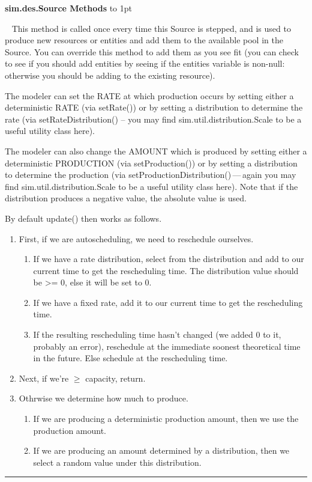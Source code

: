\documentclass[twoside,10pt]{article}
\newcommand\class[1]{\index{Classes!{#1}}\textsf{#1}}
\newcommand*{\xfill}[1][0pt]{%
	\cleaders
		\hbox to 1pt{\hss
			\raisebox{#1}{\rule{1.2pt}{0.4pt}}%
			\hss}\hfill}
\newenvironment{methods}[1]{
\vspace{1.0em}\noindent\textsf{\textbf{#1 Methods}}\quad \xfill[0.5ex]
\vspace{-0.25em}
\begin{description}
\small}
{\end{description}\hrule\vspace{1.5em}}
\newcommand{\mthd}[1]{\item[{\sf #1}]~\newline}
\begin{document}
\begin{methods}{\class{sim.des.Source}}
\mthd{protected void update()}
This method is called once every time this Source is stepped, and is used to produce new
        resources or entities and add them to the available pool in the Source.  You can override
        this method to add them as you see fit (you can check to see if you should add entities
        by seeing if the entities variable is non-null: otherwise you should be adding to the 
        existing resource).  
                
        The modeler can set the RATE at which production occurs by setting either a deterministic
        RATE (via setRate()) or by setting a distribution to determine the rate (via setRateDistribution() --
        you may find sim.util.distribution.Scale to be a useful utility class here).
        
        The modeler can also change the AMOUNT which is produced by setting either a deterministic
        PRODUCTION (via setProduction()) or by setting a distribution to determine the production (via
        setProductionDistribution()\,---\,again you may find sim.util.distribution.Scale to be a useful 
        utility class here).  Note that if the distribution produces a negative value, the absolute value is used.
        
        By default update() then works as follows.
        
        \begin{enumerate}
       \item First, if we are autoscheduling, we need to reschedule ourselves.
       \begin{enumerate}
        \item If we have a rate distribution, select from the distribution and add to our current time
        	 to get the rescheduling time.
            The distribution value should be >= 0, else it will be set to 0.
        \item If we have a fixed rate, add it to our current time to get the rescheduling time.
        \item If the resulting rescheduling time hasn't changed (we added 0 to it, probably an error), 
        reschedule at the immediate soonest theoretical time in the future.  Else schedule at the rescheduling time.
	\end{enumerate}
		
       \item Next, if we're \(\geq\) capacity, return.
        
        \item Othrwise we determine how much to produce.
        \begin{enumerate}
       \item If we are producing a deterministic production amount, then we use the production amount.
        \item If we are producing an amount determined by a distribution, then we select a random value 
        under this distribution.
        \end{enumerate}
        \end{enumerate}
                    

\end{methods}
\end{document}
